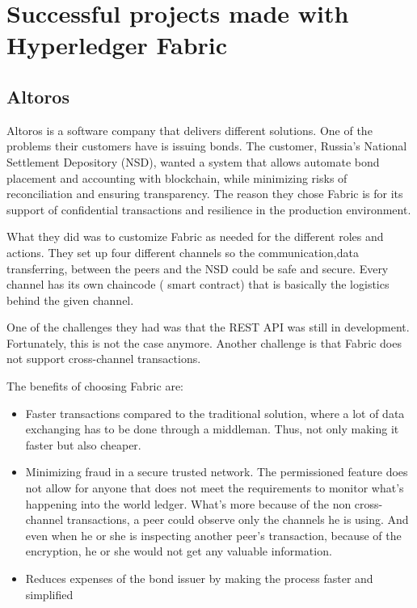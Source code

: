 \documentclass[a4paper,11pt]{report}
\begin{document}
\section{Successful projects made with Hyperledger Fabric}
\label{successfulFabric}

\subsection{Altoros}
\label{altoros}
Altoros is a software company that delivers different solutions. One of the problems their customers have is issuing bonds. The customer, Russia's National Settlement Depository (NSD), wanted a system that allows automate bond placement and accounting with blockchain, while minimizing risks of reconciliation and ensuring transparency. The reason they chose Fabric is for its support of confidential transactions and resilience in the production environment. \cite{altoros}

	What they did was to customize Fabric as needed for the different roles and actions. They set up four different channels so the communication,data transferring, between the peers and the NSD could be safe and secure. Every channel has its own chaincode ( smart contract) that is basically the logistics behind the given channel.
	
	One of the challenges they had was that the REST API was still in development. Fortunately, this is not the case anymore. Another challenge is that Fabric does not support cross-channel transactions. \cite{altorosDemo}
	
	The benefits of choosing Fabric are: 
	\begin{itemize}
	
\item Faster transactions compared to the traditional solution, where a lot of data exchanging has to be done through a middleman. Thus, not only making it faster but also cheaper. 
\item Minimizing fraud in a secure trusted network. The permissioned feature does not allow for anyone that does not meet the requirements to monitor what’s happening into the world ledger. What’s more because of the non cross-channel transactions, a peer could observe only the channels he is using. And even when he or she is inspecting another peer’s transaction, because of the encryption, he or she would not get any valuable information. 
\item Reduces expenses of the bond issuer by making the process faster and simplified
	\end{itemize}
\end{document}
